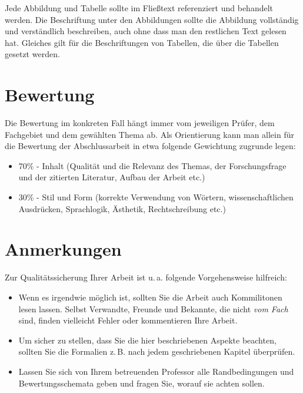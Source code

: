 \documentclass[conference,final,a4paper]{IEEEtran}
\begin{document}
Jede Abbildung und Tabelle sollte im Fließtext referenziert und behandelt werden. Die Beschriftung unter den Abbildungen sollte die Abbildung vollständig und verständlich beschreiben, auch ohne dass man den restlichen Text gelesen hat. Gleiches gilt für die Beschriftungen von Tabellen, die über die Tabellen gesetzt werden.

\section{Bewertung}
Die Bewertung im konkreten Fall hängt immer vom jeweiligen Prüfer, dem Fachgebiet und dem gewählten Thema ab. Als Orientierung kann man allein für die Bewertung der Abschlussarbeit in etwa folgende Gewichtung zugrunde legen:
\begin{itemize}
\item 70\% - Inhalt (Qualität und die Relevanz des Themas, der Forschungsfrage und der zitierten Literatur, Aufbau der Arbeit  etc.)
\item 30\% - Stil und Form (korrekte Verwendung von Wörtern, wissenschaftlichen Ausdrücken, Sprachlogik, Ästhetik, Rechtschreibung etc.)
\end{itemize}

\section{Anmerkungen}
Zur Qualitätssicherung Ihrer Arbeit ist u.\,a. folgende Vorgehensweise hilfreich:
\begin{itemize}
\item Wenn es irgendwie möglich ist, sollten Sie die Arbeit auch Kommilitonen lesen lassen. Selbst Verwandte, Freunde und Bekannte, die nicht \emph{vom Fach} sind, finden vielleicht Fehler oder kommentieren Ihre Arbeit.
\item Um sicher zu stellen, dass Sie die hier beschriebenen Aspekte beachten, sollten Sie die Formalien z.\,B. nach jedem geschriebenen Kapitel überprüfen.
\item Lassen Sie sich von Ihrem betreuenden Professor alle Randbedingungen und Bewertungsschemata geben und fragen Sie, worauf sie achten sollen. 
\end{itemize}
\end{document}
